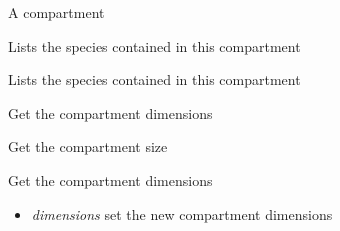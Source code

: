 \documentclass[a4paper,11pt,english]{sphinxmanual}
\begin{document}
\begin{fulllineitems}
\label{modules_doc:cbmpy.CBModel.Compartment}
A compartment

\begin{fulllineitems}
\label{modules_doc:cbmpy.CBModel.Compartment.containsReactions}
Lists the species contained in this compartment

\end{fulllineitems}


\begin{fulllineitems}
\label{modules_doc:cbmpy.CBModel.Compartment.containsSpecies}
Lists the species contained in this compartment

\end{fulllineitems}


\begin{fulllineitems}
\label{modules_doc:cbmpy.CBModel.Compartment.getDimensions}
Get the compartment dimensions

\end{fulllineitems}


\begin{fulllineitems}
\label{modules_doc:cbmpy.CBModel.Compartment.getSize}
Get the compartment size

\end{fulllineitems}


\begin{fulllineitems}
\label{modules_doc:cbmpy.CBModel.Compartment.setDimensions}
Get the compartment dimensions
\begin{itemize}
\item {} 
\emph{dimensions} set the new compartment dimensions


\end{itemize}
\end{fulllineitems}
\end{fulllineitems}
\end{document}
